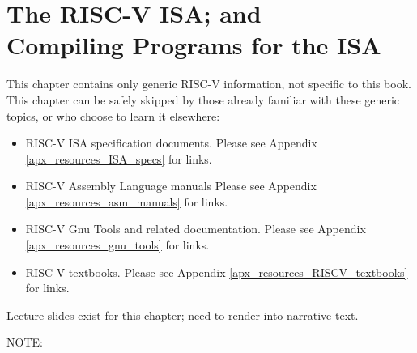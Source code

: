 

\chapter{The RISC-V ISA; and\\Compiling Programs for the ISA}



\setcounter{page}{1}
\renewcommand{\thepage}{\arabic{chapter}-\arabic{page}}

\label{ch_ISA}


This chapter contains only generic RISC-V information, not specific to
this book.  This chapter can be safely skipped by those already
familiar with these generic topics, or who choose to learn it
elsewhere:

\begin{itemize}

\item RISC-V ISA specification documents.
      Please see Appendix \ref{apx_resources_ISA_specs} for links.

\item RISC-V Assembly Language manuals
      Please see Appendix \ref{apx_resources_asm_manuals} for links.

\item RISC-V Gnu Tools and related documentation.
      Please see Appendix \ref{apx_resources_gnu_tools} for links.

\item RISC-V textbooks.
      Please see Appendix \ref{apx_resources_RISCV_textbooks} for links.

\end{itemize}

\vspace{1cm}

Lecture slides exist for this chapter; need to render into narrative text.

NOTE: 


